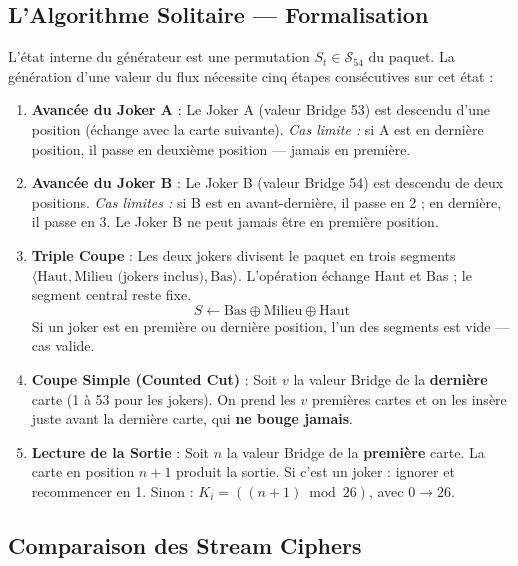 \documentclass[12pt,a4paper]{article}
\begin{document}
\subsection{L'Algorithme Solitaire — Formalisation}
L'état interne du générateur est une permutation $S_t \in \mathcal{S}_{54}$ du paquet. La génération d'une valeur du flux nécessite cinq étapes consécutives sur cet état :

\begin{enumerate}
    \item \textbf{Avancée du Joker A} : Le Joker A (valeur Bridge 53) est descendu d'une position (échange avec la carte suivante). \textit{Cas limite :} si A est en dernière position, il passe en deuxième position — jamais en première.

    \item \textbf{Avancée du Joker B} : Le Joker B (valeur Bridge 54) est descendu de deux positions. \textit{Cas limites :} si B est en avant-dernière, il passe en 2\ieme{} ; en dernière, il passe en 3\ieme{}. Le Joker B ne peut jamais être en première position.

    \item \textbf{Triple Coupe} : Les deux jokers divisent le paquet en trois segments $\langle \text{Haut}, \text{Milieu (jokers inclus)}, \text{Bas} \rangle$. L'opération échange Haut et Bas ; le segment central reste fixe.
    \begin{equation*}
        S \leftarrow \text{Bas} \oplus \text{Milieu} \oplus \text{Haut}
    \end{equation*}
    Si un joker est en première ou dernière position, l'un des segments est vide — cas valide.

    \item \textbf{Coupe Simple (Counted Cut)} : Soit $v$ la valeur Bridge de la \textbf{dernière} carte (1 à 53 pour les jokers). On prend les $v$ premières cartes et on les insère juste avant la dernière carte, qui \textbf{ne bouge jamais}.

    \item \textbf{Lecture de la Sortie} : Soit $n$ la valeur Bridge de la \textbf{première} carte. La carte en position $n+1$ produit la sortie. Si c'est un joker : ignorer et recommencer en 1. Sinon : $K_i = \left((n+1) \bmod 26\right)$, avec $0 \to 26$.
\end{enumerate}

\subsection{Comparaison des Stream Ciphers}
\end{document}
